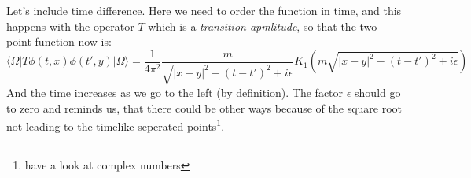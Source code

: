 	Let's include time difference. Here we need to order the function in time, and this happens with the operator $T$ which is a \textit{transition apmlitude}, so that the two-point function now is:
		\begin{equation}
			\langle \Omega| T \phi(t,x)\phi(t',y) |\Omega\rangle=
			\frac{1}{4\pi^2} \frac{m}{\sqrt{|x-y|^2-(t-t')^2+i\epsilon}}
			K_1 \left( m\sqrt{|x-y|^2-(t-t')^2+i\epsilon}\right)
		\end{equation} 
	And the time increases as we go to the left (by definition). The factor $\epsilon$ should go to zero  and reminds us, that there could be other ways because of the square root not leading to the timelike-seperated points\footnote{have a look at complex numbers}.